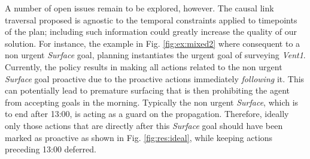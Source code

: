 A number of open issues remain to be explored, however. The causal
link traversal proposed is agnostic to the temporal constraints
applied to timepoints of the plan; including such information could
greatly increase the quality of our solution.  
For instance, the example in Fig. \ref{fig:ex:mixed2} where consequent
to a non urgent {\em Surface} goal, planning instantiates the urgent
goal of surveying \emph{Vent1}. Currently, the policy results in
making all actions related to the non urgent {\em Surface} goal
proactive due to the proactive actions immediately \emph{following}
it.
This can potentially lead to premature surfacing that is then
prohibiting the agent from accepting goals in the morning. Typically
the non urgent {\em Surface}, which is to end after 13:00, is acting
as a guard on the propagation.
Therefore, ideally only those actions that are directly after this
{\em Surface} goal should have been marked as proactive as shown in
Fig. \ref{fig:res:ideal}, while keeping actions preceding 13:00 deferred.

